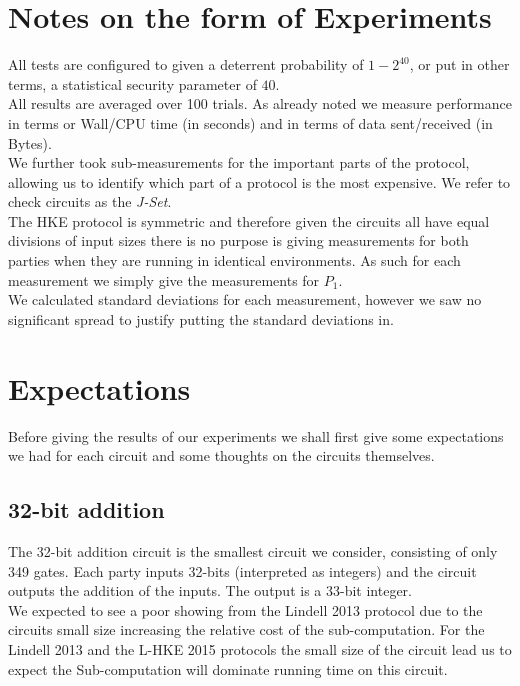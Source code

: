 \documentclass[ %
                    author={Nicholas Tutte},
                supervisor={Prof. Nigel Smart},
                    degree={MEng},
                     title={Secure Two Party Computation},
                  subtitle={A practical comparison of recent protocols},
                      type={Research - GG1K},
                      year={2015} ]{dissertation}
\begin{document}
		\section{Notes on the form of Experiments}
			All tests are configured to given a deterrent probability of $1 - 2^{40}$, or put in other terms, a statistical security parameter of $40$.\\

			All results are averaged over 100 trials. As already noted we measure performance in terms or Wall/CPU time (in seconds) and in terms of data sent/received (in Bytes).\\

			We further took sub-measurements for the important parts of the protocol, allowing us to identify which part of a protocol is the most expensive. We refer to check circuits as the \emph{J-Set}.\\

			The HKE protocol is symmetric and therefore given the circuits all have equal divisions of input sizes there is no purpose is giving measurements for both parties when they are running in identical environments. As such for each measurement we simply give the measurements for $P_1$.\\

			We calculated standard deviations for each measurement, however we saw no significant spread to justify putting the standard deviations in.


		\section{Expectations}
			Before giving the results of our experiments we shall first give some expectations we had for each circuit and some thoughts on the circuits themselves.

			\subsection{32-bit addition}
				The 32-bit addition circuit is the smallest circuit we consider, consisting of only 349 gates. Each party inputs 32-bits (interpreted as integers) and the circuit outputs the addition of the inputs. The output is a 33-bit integer.\\

				We expected to see a poor showing from the Lindell 2013 protocol due to the circuits small size increasing the relative cost of the sub-computation. For the Lindell 2013 and the L-HKE 2015 protocols the small size of the circuit lead us to expect the Sub-computation will dominate running time on this circuit.\\
\end{document}
